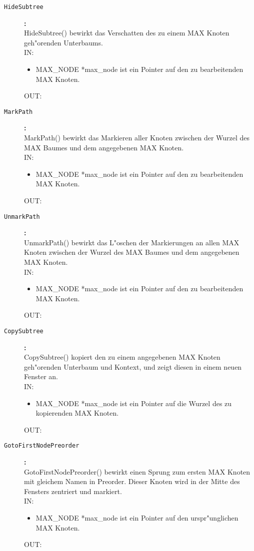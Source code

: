 \begin{description}
\item[\tt HideSubtree]{\bf :\\}
HideSubtree() bewirkt das Verschatten des zu einem MAX Knoten geh"orenden Unterbaums. \\
IN:
\begin{itemize}
   \item MAX\_NODE *max\_node ist ein Pointer auf den zu bearbeitenden MAX Knoten.
\end{itemize}
OUT:

\item[\tt MarkPath]{\bf :\\}
MarkPath() bewirkt das Markieren aller Knoten zwischen der Wurzel des MAX Baumes und dem angegebenen MAX Knoten. \\
IN:
\begin{itemize}
   \item MAX\_NODE *max\_node ist ein Pointer auf den zu bearbeitenden MAX Knoten.
\end{itemize}
OUT:

\item[\tt UnmarkPath]{\bf :\\}
UnmarkPath() bewirkt das L"oschen der Markierungen an allen MAX Knoten zwischen der Wurzel des MAX Baumes und dem angegebenen MAX Knoten. \\
IN:
\begin{itemize}
   \item MAX\_NODE *max\_node ist ein Pointer auf den zu bearbeitenden MAX Knoten.
\end{itemize}
OUT:

\item[\tt CopySubtree]{\bf :\\}
CopySubtree() kopiert den zu einem angegebenen MAX Knoten geh"orenden Unterbaum und Kontext, und zeigt diesen in einem neuen Fenster an. \\
IN:
\begin{itemize}
   \item MAX\_NODE *max\_node ist ein Pointer auf die Wurzel des zu kopierenden MAX Knoten.
\end{itemize}
OUT:

\item[\tt GotoFirstNodePreorder]{\bf :\\}
GotoFirstNodePreorder() bewirkt einen Sprung zum ersten MAX Knoten mit gleichem Namen in Preorder. Dieser Knoten wird in der Mitte des Fensters zentriert und markiert. \\
IN:
\begin{itemize}
   \item MAX\_NODE *max\_node ist ein Pointer auf den urspr"unglichen MAX Knoten.
\end{itemize}
OUT:


\end{description}
